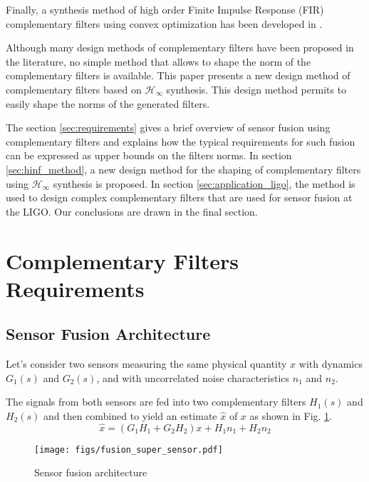 \documentclass[conference]{IEEEtran}
\begin{document}
Finally, a synthesis method of high order Finite Impulse Response (FIR) complementary filters using convex optimization has been developed in \cite{hua05_low_ligo,hua04_polyp_fir_compl_filter_contr_system}. \par
Although many design methods of complementary filters have been proposed in the literature, no simple method that allows to shape the norm of the complementary filters is available.
This paper presents a new design method of complementary filters based on \(\mathcal{H}_\infty\) synthesis.
This design method permits to easily shape the norms of the generated filters.\par
The section \ref{sec:requirements} gives a brief overview of sensor fusion using complementary filters and explains how the typical requirements for such fusion can be expressed as upper bounds on the filters norms.
In section \ref{sec:hinf_method}, a new design method for the shaping of complementary filters using \(\mathcal{H}_\infty\) synthesis is proposed.
In section \ref{sec:application_ligo}, the method is used to design complex complementary filters that are used for sensor fusion at the LIGO.
Our conclusions are drawn in the final section.

\section{Complementary Filters Requirements}
\label{sec:org41613b0}
\label{sec:requirements}
\subsection{Sensor Fusion Architecture}
\label{sec:org3da9043}
\label{sec:sensor_fusion}

Let's consider two sensors measuring the same physical quantity \(x\) with dynamics \(G_1(s)\) and \(G_2(s)\), and with uncorrelated noise characteristics \(n_1\) and \(n_2\).

The signals from both sensors are fed into two complementary filters \(H_1(s)\) and \(H_2(s)\) and then combined to yield an estimate \(\hat{x}\) of \(x\) as shown in Fig. \ref{fig:fusion_super_sensor}.
\begin{equation}
\label{eq:comp_filter_estimate}
  \hat{x} = \left(G_1 H_1 + G_2 H_2\right) x + H_1 n_1 + H_2 n_2
\end{equation}

\begin{figure}[htbp]
\centering
\texttt{[image: figs/fusion\_super\_sensor.pdf]}
\caption{\label{fig:fusion_super_sensor}
Sensor fusion architecture}
\end{figure}
\end{document}
